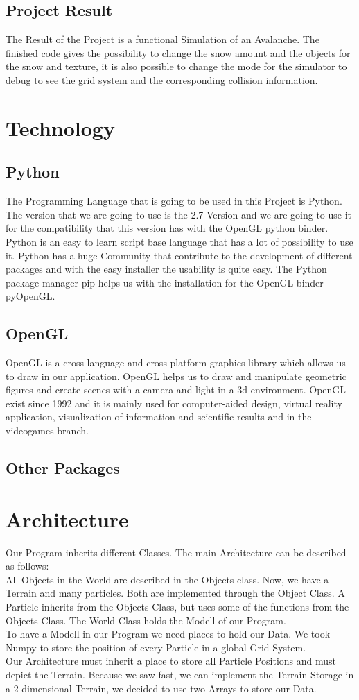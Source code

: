 \documentclass{sig-alternate-05-2015}
\begin{document}
\subsection{Project Result}
The Result of the Project is a functional Simulation of an Avalanche. The finished code gives the possibility to change the snow amount and the objects for the snow and texture, it is also possible to change the mode for the simulator to debug to see the grid system and the corresponding collision information. 
\section{Technology}
\subsection{Python}
The Programming Language that is going to be used in this Project is Python. The version that we are going to use is the 2.7 Version and we are going to use it for the compatibility that this version has with the OpenGL python binder. Python is an easy to learn script base language that has a lot of possibility to use it. Python has a huge Community that contribute to the development of different packages and with the easy installer the usability is quite easy. The Python package manager pip helps us with the installation for the OpenGL binder pyOpenGL.
\subsection{OpenGL}
OpenGL is a cross-language and cross-platform graphics library which allows us to draw in our application. OpenGL helps us to draw and manipulate geometric figures and create scenes with a camera and light in a 3d environment. OpenGL exist since 1992 and it is mainly used for computer-aided design, virtual reality application, visualization of information and scientific results and in the videogames branch.
\subsection{Other Packages}
\section{Architecture}
Our Program inherits different Classes. The main Architecture can be described as follows:\\
All Objects in the World are described in the Objects class. Now, we have a Terrain and many particles. Both are implemented through the Object Class. A Particle inherits from the Objects Class, but uses some of the functions from the Objects Class. The World Class holds the Modell of our Program. \\
To have a Modell in our Program we need places to hold our Data. We took Numpy to store the position of every Particle in a global Grid-System.\\
Our Architecture must inherit a place to store all Particle Positions and must depict the Terrain. Because we saw fast, we can implement the Terrain Storage in a 2-dimensional Terrain, we decided to use two Arrays to store our Data. \\
\end{document}
